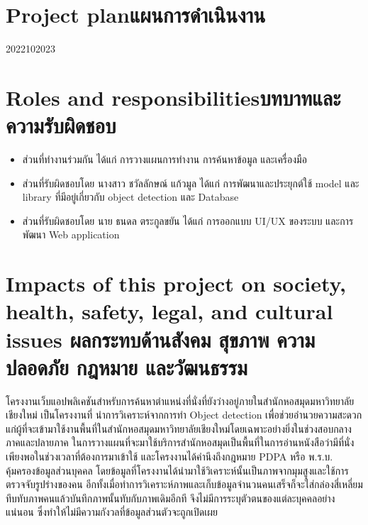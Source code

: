 \section{\ifenglish Project plan\else แผนการดำเนินงาน\fi}

\begin{plan}{11}{2022}{10}{2023}
\end{plan}

\section{\ifenglish Roles and responsibilities\else บทบาทและความรับผิดชอบ\fi}
\begin{itemize}
\item ส่วนที่ทำงานร่วมกัน ได้แก่ การวางแผนการทำงาน การค้นหาข้อมูล และเครื่องมือ
\item ส่วนที่รับผิดชอบโดย นางสาว ชวัลลักษณ์ แก้วมูล ได้แก่ การพัฒนาและประยุกต์ใช้ model และ library ที่มีอยู่เกี่ยวกับ object detection และ Database
\item ส่วนที่รับผิดชอบโดย นาย ธนดล ตระกูลขยัน ได้แก่ การออกแบบ UI/UX ของระบบ และการพัฒนา Web application
\end{itemize}
\section{\ifenglish%
Impacts of this project on society, health, safety, legal, and cultural issues
\else%
ผลกระทบด้านสังคม สุขภาพ ความปลอดภัย กฎหมาย และวัฒนธรรม
\fi}
โครงงานเว็บแอปพลิเคชันสำหรับการค้นหาตำแหน่งที่นั่งที่ยังว่างอยู่ภายในสำนักหอสมุดมหาวิทยาลัยเชียงใหม่ เป็นโครงงานที่
นำการวิเคราะห์จากการทำ Object detection เพื่อช่วยอำนวยความสะดวกแก่ผู้ที่จะเข้ามาใช้งานพื้นที่ในสำนักหอสมุดมหาวิทยาลัยเชียงใหม่โดยเฉพาะอย่างยิ่งในช่วงสอบกลางภาคและปลายภาค
ในการวางแผนที่จะมาใช้บริการสำนักหอสมุดเป็นพื้นที่ในการอ่านหนังสือว่ามีที่นั่งเพียงพอในช่วงเวลาที่ต้องการมาเข้าใช้ และโครงงานได้คำนึงถึงกฎหมาย PDPA หรือ พ.ร.บ. คุ้มครองข้อมูลส่วนบุคคล\cite{PDPA} 
โดยข้อมูลที่โครงงานได้นำมาใช้วิเคราะห์นั้นเป็นภาพจากมุมสูงและใช้การตรวจจับรูปร่างของคน อีกทั้งเมื่อทำการวิเคราะห์ภาพและเก็บข้อมูลจำนวนคนเสร็จก็จะใส่กล่องสี่เหลี่ยมทึบทับภาพคนแล้วบันทึกภาพนั้นทับกับภาพเดิมอีกที จึงไม่มีการระบุตัวตนของแต่ละบุคคลอย่างแน่นอน
ซึ่งทำให้ไม่มีความกังวลที่ข้อมูลส่วนตัวจะถูกเปิดเผย

